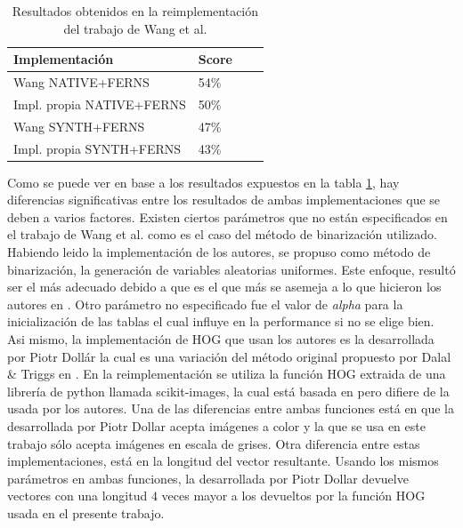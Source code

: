 	\begin{table}
		\centering
	    \begin{tabular}{ | l | l | l | p{5cm} |}
    			\hline
    				\textbf{Implementación} & \textbf{Score} \\ \hline
    				Wang NATIVE+FERNS & 54\% \\ \hline
    				Impl. propia NATIVE+FERNS & 50\% \\ \hline
    				Wang SYNTH+FERNS & 47\% \\ \hline
    				Impl. propia SYNTH+FERNS & 43\% \\
    				
    			\hline
    		\end{tabular}	
    		\caption[Resultados reales y sintéticas para baseline]{Resultados obtenidos en la reimplementación del trabajo de Wang et al.}
    		\label{table: Baseline-Table}
	\end{table}
	
	Como se puede ver en base a los resultados expuestos en la tabla \ref{table: Baseline-Table}, hay diferencias significativas entre los resultados de ambas implementaciones que se deben a varios factores. Existen ciertos parámetros que no están especificados en el trabajo de Wang et al. como es el caso del método de binarización utilizado. Habiendo leido la implementación de los autores, se propuso como método de binarización, la generación de variables aleatorias uniformes. Este enfoque, resultó ser el más adecuado debido a que es el que más se asemeja a lo que hicieron los autores en \cite{wang}.	Otro parámetro no especificado fue el valor de \textit{alpha} para la inicialización de las tablas el cual influye en la performance si no se elige bien. Asi mismo, la implementación de HOG que usan los autores es la desarrollada por Piotr Dollár la cual es una variación del método original propuesto por Dalal \& Triggs en \cite{DT05}. En la reimplementación se utiliza la función HOG extraida de una librería de python llamada scikit-images, la cual está basada en \cite{DT05} pero difiere de la usada por los autores. Una de las diferencias entre ambas funciones está en que la desarrollada por Piotr Dollar acepta imágenes a color y la que se usa en este trabajo sólo acepta imágenes en escala de grises. Otra diferencia entre estas implementaciones, está en la longitud del vector resultante. Usando los mismos parámetros en ambas funciones, la desarrollada por Piotr Dollar devuelve vectores con una longitud $4$ veces mayor a los devueltos por la función HOG usada en el presente trabajo.
	
